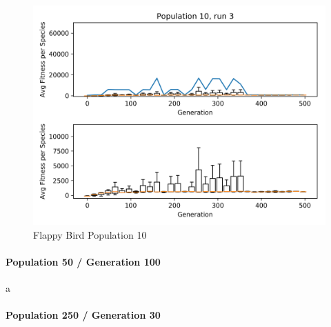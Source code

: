 \begin{figure}[h!]
				\begin{minipage}{0.33\textwidth}
					\centering
					\includegraphics[width=1\textwidth]{graphics/flappy/pop10_run3} %
				\end{minipage}
				\caption{Flappy Bird Population 10}
			\end{figure}
		
		\paragraph{Population 50 / Generation 100}
			a
		
		\paragraph{Population 250 / Generation 30}
		
